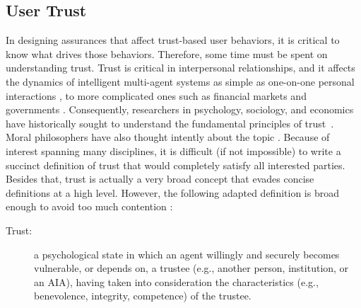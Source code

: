\subsection{User Trust} \label{sec:trust}
    In designing assurances that affect trust-based user behaviors, it is critical to know what drives those behaviors. Therefore, some time must be spent on understanding trust. Trust is critical in interpersonal relationships, and it affects the dynamics of intelligent multi-agent systems as simple as one-on-one personal interactions  \cite{Lewicki2006-hj}, to more complicated ones such as financial markets and governments \cite{Fukuyama1995-un}. Consequently, researchers in psychology, sociology, and economics have historically sought to understand the fundamental principles of trust~\cite{Gambetta1988-pi}. Moral philosophers have also thought intently about the topic \cite{Baier1986-im}. Because of interest spanning many disciplines, it is difficult (if not impossible) to write a succinct definition of trust that would completely satisfy all interested parties. Besides that, trust is actually a very broad concept that evades concise definitions at a high level. However, the following adapted definition is broad enough to avoid too much contention \cite{McKnight2004-vv}:

    \begin{description}
        \item [Trust:] a psychological state in which an agent willingly and securely becomes vulnerable, or depends on, a trustee (e.g., another person, institution, or an AIA), having taken into consideration the characteristics (e.g., benevolence, integrity, competence) of the trustee.
    \end{description}

